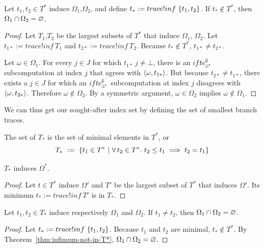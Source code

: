 \begin{theorem}
\label{thm:infimum-not-in-T*}
Let $t_1,t_2 \in T^*$ induce $\Omega_1$,$\Omega_2$, and define $t_* := trace!inf~\{{t_1,t_2}\}$.
If $t_* \notin T^*$, then $\Omega_1 \cap \Omega_2 = \varnothing$.
\end{theorem}
\begin{proof}
Let $T_1$,$T_2$ be the largest subsets of $T^*$ that induce $\Omega_1$, $\Omega_2$.
Let $t_{1*} := trace!inf~T_1$ and $t_{2*} := trace!inf~T_2$.
Because $t_* \notin T^*$, $t_{1*} \neq t_{2*}$.

Let $\omega \in \Omega_1$.
For every $j \in J$ for which $t_{1*}~j \neq \bot$, there is an $ifte^{\mspace{-2mu}\Downarrow\mspace{-2mu}}_{\mspace{-2mu}{\bot^{\mspace{-4mu}*}}}$ subcomputation at index $j$ that agrees with $\langle{\omega,t_{1*}}\rangle$.
But because $t_{2*} \neq t_{1*}$, there exists a $j \in J$ for which an $ifte^{\mspace{-2mu}\Downarrow\mspace{-2mu}}_{\mspace{-2mu}{\bot^{\mspace{-4mu}*}}}$ subcomputation at index $j$ disagrees with $\langle{\omega,t_{2*}}\rangle$.
Therefore $\omega \notin \Omega_2$.
By a symmetric argument, $\omega \in \Omega_2$ implies $\omega \notin \Omega_1$.
\end{proof}

We can thus get our sought-after index set by defining the set of smallest branch traces.

\begin{definition}
The set of  $T_*$ is the set of minimal elements in $T^*$, or
\begin{equation}
	T_*\ :=\ \lbrace {t_1 \in T^*} \ \lvert\ {\forall\,{t_2 \in T^*}\ldotp\, t_2 \leq t_1 \implies t_2 = t_1} \rbrace
\end{equation}
\end{definition}

\begin{theorem}
$T_*$ induces $\Omega^*$.
\end{theorem}
\begin{proof}
Let $t \in T^*$ induce $\Omega'$ and $T'$ be the largest subset of $T^*$ that induces $\Omega'$.
Its minimum $t_* := trace!inf~T'$ is in $T_*$.
\end{proof}

\begin{theorem}[$T_*$ partitions]
\label{thm:minimal-induces-partition}
Let $t_1,t_2 \in T_*$ induce respectively $\Omega_1$ and $\Omega_2$.
If $t_1 \neq t_2$, then $\Omega_1 \cap \Omega_2 = \varnothing$.
\end{theorem}
\begin{proof}
Let $t_* := trace!inf~\{{t_1,t_2}\}$.
Because $t_1$ and $t_2$ are minimal, $t_* \notin T^*$.
By Theorem~\ref{thm:infimum-not-in-T*}, $\Omega_1 \cap \Omega_2 = \varnothing$.
\end{proof}

